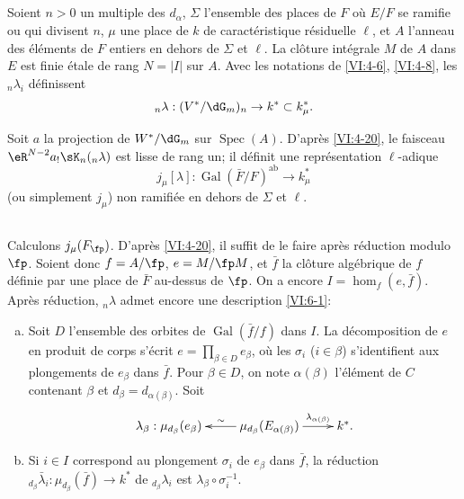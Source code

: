 \documentclass[oneside]{book}
\DeclareMathOperator{\gal}{Gal}
\DeclareMathOperator{\spec}{Spec}
\theoremstyle{sga-source}
\theoremstyle{sga-source-dash}
\theoremstyle{sga-source-dotdash}
\theoremstyle{sga-source-number-note-dash}
\theoremstyle{sga-source-note-number-dotdash}
\theoremstyle{sga-source-example-dotdash}
\theoremstyle{sga-source-inline-number}
\theoremstyle{sga-source-bare-number}
\theoremstyle{sga-source}
\newcommand{\PrintPage}[1]{}\newcommand{\MathPage}[1]{}\newcommand{\PrintCite}[2]{#1}\newcommand{\var}[3]{#2}
\begin{document}
\subsection{}\label{VI:6-2}

Soient $n>0$ un multiple des $d_\alpha$, $\Sigma$ l'ensemble des places de $F$ 
où $E/F$ se ramifie ou qui divisent $n$, $\mu$ une place de $k$ de 
caractéristique résiduelle $\ell$, et $A$ l'anneau des éléments de $F$ 
entiers en dehors de $\Sigma$ et $\ell$. La clôture intégrale $M$ de $A$ dans $E$ 
est finie étale de rang $N=|I|$ sur $A$. Avec les notations de \ref{VI:4-6}, 
\ref{VI:4-8}, les $_n \lambda_i$ définissent 
\[
  _n\lambda:(V^\ast/\dG_m)_n \to k^\ast \subset k_\mu^\ast \text{.} 
\]

Soit $a$ la projection de $W^\ast/\dG_m$ sur $\spec(A)$. D'après 
\ref{VI:4-20}, le faisceau $\eR^{N-2} a_! \sK_n(_n \lambda)$ est lisse de rang 
un; il définit une représentation $\ell$-adique 
\[
  j_\mu[\lambda]:\gal(\bar F/F)^\text{ab} \to k_\mu^\ast 
\]
(ou simplement $j_\mu$) non ramifiée en dehors de $\Sigma$ et $\ell$. 





\subsection{}\label{VI:6-3}

Calculons $j_\mu(F_\fp)$. D'après \ref{VI:4-20}, il suffit de le faire 
après réduction modulo $\fp$. Soient donc $f=A/\fp$, $e=M/\fp  M$, et 
$\bar f$ la clôture algébrique de $f$ définie par une place de $\bar F$ 
au-dessus de $\fp$. On a encore $I=\hom_f(e,\bar f)$. Après réduction, 
$_n\lambda$ admet encore une description \ref{VI:6-1}: 
\begin{enumerate}[a)]
  \item Soit $D$ l'ensemble des orbites de $\gal(\bar f/f)$ dans $I$. La 
    décomposition de $e$ en produit de corps s'écrit 
    $e=\prod_{\beta\in D} e_\beta$, où les $\sigma_i$ ($i\in \beta$) 
    s'identifient aux \var{plongements de $e_\beta$ dans $f$}{plongements de $e_\beta$ dans $\bar f$}{S45-SOL-0898}. Pour $\beta\in D$, on 
    note $\alpha(\beta)$ l'élément de $C$ \PrintPage{215}
contenant $\beta$ et 
    $d_\beta=d_{\alpha(\beta)}$. Soit 
    \[\xymatrix{
      \lambda_\beta : \mu_{d_\beta}(e_\beta) 
        & \ar[l]_-\sim \mu_{d_\beta}(E_{\alpha(\beta)}) \ar[r]^-{\var{\lambda_{d(\beta)}}{\lambda_{\alpha(\beta)}}{S45-SOL-0899}} 
        & k^\ast \text{.} 
    }\]
  \item Si $i\in I$ correspond au plongement $\sigma_i$ de $e_\beta$ dans 
    $\bar f$, la réduction 
    $_{d_\beta} \bar\lambda_i:\mu_{d_\beta}(\bar f) \to k^\ast$ de 
    $_{d_\beta} \lambda_i$ est 
    $\lambda_\beta \circ \sigma_i^{-1}$. 
\end{enumerate}
\end{document}
